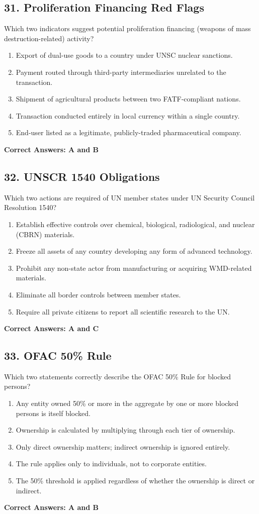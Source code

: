 \documentclass[11pt,a4paper]{article}
\begin{document}
	\subsection{31. Proliferation Financing Red Flags}
	Which two indicators suggest potential proliferation financing (weapons of mass destruction-related) activity?
	\begin{enumerate}[label=\Alph*.]
		\item Export of dual-use goods to a country under UNSC nuclear sanctions.
		\item Payment routed through third-party intermediaries unrelated to the transaction.
		\item Shipment of agricultural products between two FATF-compliant nations.
		\item Transaction conducted entirely in local currency within a single country.
		\item End-user listed as a legitimate, publicly-traded pharmaceutical company.
	\end{enumerate}
	\textbf{Correct Answers: A and B}
	
	\subsection{32. UNSCR 1540 Obligations}
	Which two actions are required of UN member states under UN Security Council Resolution 1540?
	\begin{enumerate}[label=\Alph*.]
		\item Establish effective controls over chemical, biological, radiological, and nuclear (CBRN) materials.
		\item Freeze all assets of any country developing any form of advanced technology.
		\item Prohibit any non-state actor from manufacturing or acquiring WMD-related materials.
		\item Eliminate all border controls between member states.
		\item Require all private citizens to report all scientific research to the UN.
	\end{enumerate}
	\textbf{Correct Answers: A and C}
	
	\subsection{33. OFAC 50\% Rule}
	Which two statements correctly describe the OFAC 50\% Rule for blocked persons?
	\begin{enumerate}[label=\Alph*.]
		\item Any entity owned 50\% or more in the aggregate by one or more blocked persons is itself blocked.
		\item Ownership is calculated by multiplying through each tier of ownership.
		\item Only direct ownership matters; indirect ownership is ignored entirely.
		\item The rule applies only to individuals, not to corporate entities.
		\item The 50\% threshold is applied regardless of whether the ownership is direct or indirect.
	\end{enumerate}
	\textbf{Correct Answers: A and B}
	
\end{document}
